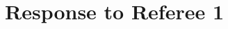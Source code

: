 \documentclass[12pt
]{article}
\begin{document}





\section*{Response to Referee 1}

\medskip
\end{document}
